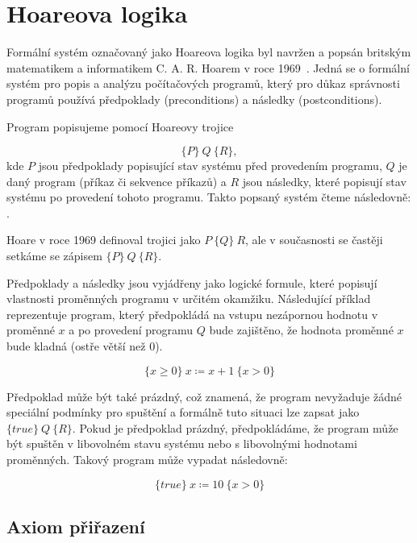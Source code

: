 \chapter{Hoareova logika}
\label{ch:hoareova-logika}

Formální systém označovaný jako Hoareova logika byl navržen a popsán
britským matematikem a informatikem C. A. R. Hoarem v roce 1969~\cite{Hoare1969}.
Jedná se o formální systém pro popis a analýzu počítačových programů,
který pro důkaz správnosti programů používá předpoklady (preconditions) a následky (postconditions).

Program popisujeme pomocí Hoareovy trojice

\begin{equation*}
    \{P\} \  Q \  \{R\},
\end{equation*}
kde $P$ jsou předpoklady popisující stav systému před provedením programu,
$Q$ je daný program (příkaz či sekvence příkazů)
a $R$ jsou následky, které popisují stav systému po provedení tohoto programu.
Takto popsaný systém čteme následovně:
.

Hoare v roce 1969 definoval trojici jako $P \ \{ Q \} \  R$,
ale v současnosti se častěji setkáme se zápisem $\{ P \} \  Q \ \{ R \}$.

Předpoklady a následky jsou vyjádřeny jako logické formule,
které popisují vlastnosti proměnných programu v určitém okamžiku.
Následující příklad reprezentuje program, který předpokládá na vstupu nezápornou hodnotu v proměnné $x$
a po provedení programu $Q$ bude zajištěno, že hodnota proměnné $x$ bude kladná (ostře větší než 0).

\begin{equation*}
    \{ x \geq 0 \} \  x \coloneqq x + 1 \  \{ x > 0 \}
\end{equation*}

Předpoklad může být také prázdný, což znamená, že program nevyžaduje žádné speciální podmínky pro spuštění
a formálně tuto situaci lze zapsat jako $\{ true \} \  Q \  \{ R \}$.
Pokud je předpoklad prázdný, předpokládáme, že program může být spuštěn
v libovolném stavu systému nebo s libovolnými hodnotami proměnných.
Takový program může vypadat následovně:

\begin{equation*}
    \{ true \} \  x \coloneqq 10 \  \{ x > 0 \}
\end{equation*}

\section{Axiom přiřazení}
\label{sec:hoare-axiom-prirazeni}

